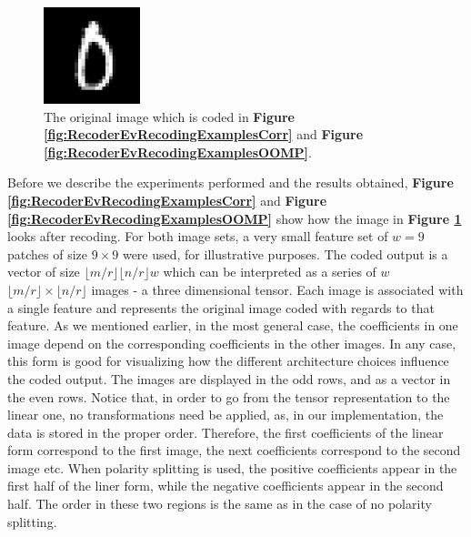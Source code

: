\documentclass[12pt,a4paper,oneside,english]{UPBThesis}
\newcommand{\hctimes}[2]{{#1}\!\times\!{#2}}
\begin{document}
\begin{figure}
\begin{center}
\includegraphics[width=0.25\textwidth]{thesis_data/recoderev/original_image.png}
\end{center}
\caption{The original image which is coded in \textbf{Figure \ref{fig:RecoderEvRecodingExamplesCorr}} and \textbf{Figure \ref{fig:RecoderEvRecodingExamplesOOMP}}.}
\label{fig:RecoderEvOriginalImage}
\end{figure}

Before we describe the experiments performed and the results obtained, \textbf{Figure \ref{fig:RecoderEvRecodingExamplesCorr}} and \textbf{Figure \ref{fig:RecoderEvRecodingExamplesOOMP}} show how the image in \textbf{Figure \ref{fig:RecoderEvOriginalImage}} looks after recoding. For both image sets, a very small feature set of $w=9$ patches of size $\hctimes{9}{9}$ were used, for illustrative purposes. The coded output is a vector of size $\lfloor m / r \rfloor \lfloor n / r \rfloor w$ which can be interpreted as a series of $w$ $\hctimes{\lfloor m / r \rfloor}{\lfloor n / r \rfloor}$ images - a three dimensional tensor. Each image is associated with a single feature and represents the original image coded with regards to that feature. As we mentioned earlier, in the most general case, the coefficients in one image depend on the corresponding coefficients in the other images. In any case, this form is good for visualizing how the different architecture choices influence the coded output. The images are displayed in the odd rows, and as a vector in the even rows. Notice that, in order to go from the tensor representation to the linear one, no transformations need be applied, as, in our implementation, the data is stored in the proper order. Therefore, the first coefficients of the linear form correspond to the first image, the next coefficients correspond to the second image etc. When polarity splitting is used, the positive coefficients appear in the first half of the liner form, while the negative coefficients appear in the second half. The order in these two regions is the same as in the case of no polarity splitting.
\end{document}
